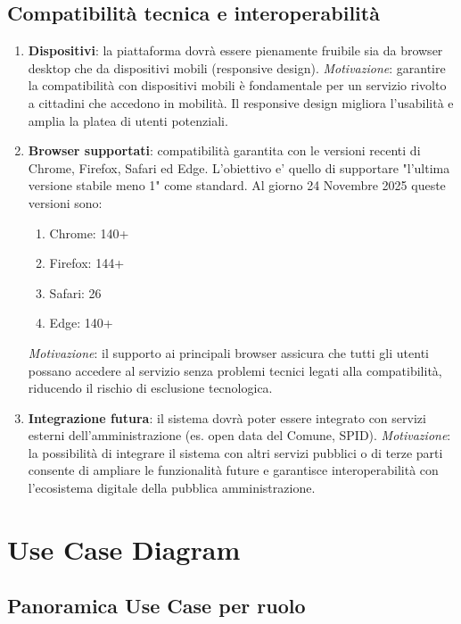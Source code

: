 \documentclass{article}
\begin{document}
\subsection{Compatibilit\`a tecnica e interoperabilit\`a}
\begin{enumerate}[label=\textbf{RNF\arabic*}, resume]
	\item \textbf{Dispositivi}: la piattaforma dovrà essere pienamente fruibile sia da browser desktop che da dispositivi mobili (responsive design).  
	\textit{Motivazione}: garantire la compatibilità con dispositivi mobili è fondamentale per un servizio rivolto a cittadini che accedono in mobilità. Il responsive design migliora l’usabilità e amplia la platea di utenti potenziali.

	\item \textbf{Browser supportati}: compatibilità garantita con le versioni recenti di Chrome, Firefox, Safari ed Edge. L'obiettivo e' quello di supportare "l'ultima versione stabile meno 1" come standard. Al giorno 24 Novembre 2025 queste versioni sono:
   \begin{enumerate}
      \item Chrome: 140+
      \item Firefox: 144+
      \item Safari: 26
      \item Edge: 140+
   \end{enumerate}
	\textit{Motivazione}: il supporto ai principali browser assicura che tutti gli utenti possano accedere al servizio senza problemi tecnici legati alla compatibilità, riducendo il rischio di esclusione tecnologica.

	\item \textbf{Integrazione futura}: il sistema dovrà poter essere integrato con servizi esterni dell’amministrazione (es. open data del Comune, SPID).  
	\textit{Motivazione}: la possibilità di integrare il sistema con altri servizi pubblici o di terze parti consente di ampliare le funzionalità future e garantisce interoperabilità con l’ecosistema digitale della pubblica amministrazione.
\end{enumerate}

\section{Use Case Diagram}

\subsection*{Panoramica Use Case per ruolo}
\end{document}

